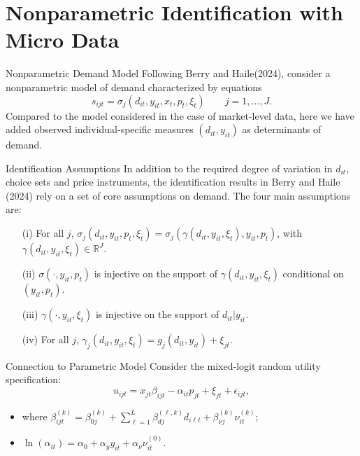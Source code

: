\documentclass[aspectratio=169]{beamer}  %
\begin{document}
\section{Nonparametric Identification with Micro Data}
\begin{frame}{Nonparametric Demand Model}
    Following Berry and Haile(2024), consider a nonparametric model of demand characterized by equations
    \begin{equation}
        s_{ijt} = \sigma_j(d_{it}, y_{it}, x_t, p_t, \xi_t) \qquad j = 1, \ldots, J.
    \end{equation}
    Compared to the model considered in the case of market-level data, here we have added observed individual-specific measures \((d_{it}, y_{it})\) as determinants of demand.
\end{frame}

\begin{frame}{Identification Assumptions}
    In addition to the required degree of variation in \(d_{it}\), choice sets and price instruments, the identification results in Berry and Haile (2024) rely on a set of core assumptions on demand.
    The four main assumptions are:
    \begin{itemize}
        \item[(i)] For all \(j\), \(\sigma_j(d_{it}, y_{it}, p_t, \xi_t) = \sigma_j(\gamma(d_{it}, y_{it}, \xi_t), y_{it}, p_t)\), with \(\gamma(d_{it}, y_{it}, \xi_t) \in \mathbb{R}^J\).
        \item[(ii)] \(\sigma(\cdot, y_{it}, p_t)\) is injective on the support of \(\gamma(d_{it}, y_{it}, \xi_t)\) conditional on \((y_{it}, p_t)\).
        \item[(iii)] \(\gamma(\cdot, y_{it}, \xi_t)\) is injective on the support of \(d_{it}|y_{it}\).
        \item[(iv)] For all \(j\), \(\gamma_j(d_{it}, y_{it}, \xi_t) = g_j(d_{it}, y_{it}) + \xi_{jt}\).
    \end{itemize}
\end{frame}

\begin{frame}{Connection to Parametric Model}
    Consider the mixed-logit random utility specification:
    \begin{equation}
        u_{ijt} = x_{jt} \beta_{ijt} - \alpha_{it} p_{jt} + \xi_{jt} + \epsilon_{ijt},
    \end{equation}
    \begin{itemize}
    \item where \(\beta_{ijt}^{(k)} = \beta_{0j}^{(k)} + \sum_{\ell=1}^L \beta_{dj}^{(\ell, k)} d_{i\ell t} + \beta_{\nu j}^{(k)} \nu_{it}^{(k)}\);
    \item \(\ln(\alpha_{it}) = \alpha_0 + \alpha_y y_{it} + \alpha_\nu \nu_{it}^{(0)}\). 
    \end{itemize}
\end{frame}
\end{document}
